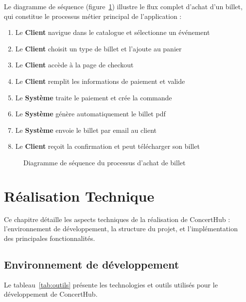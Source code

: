 \documentclass[a4paper,12pt,twoside]{report}
\begin{document}
Le diagramme de séquence (figure~\ref{fig:sequence}) illustre le flux complet d'achat d'un billet, qui constitue le processus métier principal de l'application :

\begin{enumerate}
    \item Le \textbf{Client} navigue dans le catalogue et sélectionne un événement
    \item Le \textbf{Client} choisit un type de billet et l'ajoute au panier
    \item Le \textbf{Client} accède à la page de checkout
    \item Le \textbf{Client} remplit les informations de paiement et valide
    \item Le \textbf{Système} traite le paiement et crée la commande
    \item Le \textbf{Système} génère automatiquement le billet \gls{pdf}
    \item Le \textbf{Système} envoie le billet par email au client
    \item Le \textbf{Client} reçoit la confirmation et peut télécharger son billet
\end{enumerate}

\begin{figure}[!h]
    \centering
    \caption{Diagramme de séquence du processus d'achat de billet}
    \label{fig:sequence}
\end{figure}

\chapter{Réalisation Technique}
\thispagestyle{empty}

Ce chapitre détaille les aspects techniques de la réalisation de ConcertHub : l'environnement de développement, la structure du projet, et l'implémentation des principales fonctionnalités.

\section{Environnement de développement}

Le tableau~\ref{tab:outils} présente les technologies et outils utilisés pour le développement de ConcertHub.
\end{document}
